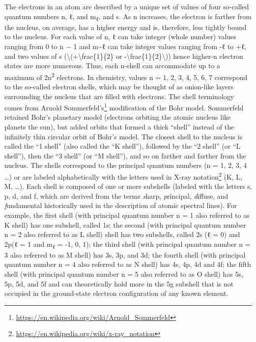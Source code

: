\documentclass[
]{article}
\let\rmarkdownfootnote\footnote%
\def\footnote{\protect\rmarkdownfootnote}
\renewcommand{\href}[2]{#2\footnote{\url{#1}}}
\theoremstyle{definition}
\theoremstyle{definition}
\theoremstyle{definition}
\theoremstyle{remark}
\begin{document}
The electrons in an atom are described by a unique set of values of four
so-called quantum numbers n, ℓ, and m\textsubscript{ℓ}, and s. As n
increases, the electron is farther from the nucleus, on average, has a
higher energy and is, therefore, less tightly bound to the nucleus. For
each value of n, ℓ can take integer (whole number) values ranging from 0
to n − 1 and m\textasciitilde ℓ can take integer values ranging from -ℓ
to +ℓ, and two values of s
({\textbackslash(+\textbackslash frac\{1\}\{2\} or
-\textbackslash frac\{1\}\{2\}\textbackslash)}) hence higher-n electron
states are more numerous. Thus, each n-shell can accommodate up to a
maximum of 2n\textsuperscript{2} electrons. In chemistry, values n = 1,
2, 3, 4, 5, 6, 7 correspond to the so-called electron shells, which may
be thought of as onion-like layers surrounding the nucleus that are
filled with electrons. The shell terminology comes from
\href{https://en.wikipedia.org/wiki/Arnold_Sommerfeld}{Arnold
Sommerfeld's} modification of the Bohr model. Sommerfeld retained Bohr's
planetary model (electrons orbiting the atomic nucleus like planets the
sun), but added orbits that formed a thick ``shell'' instead of the
infinitely thin circular orbit of Bohr's model. The closest shell to the
nucleus is called the ``1 shell'' (also called the ``K shell''),
followed by the ``2 shell'' (or ``L shell''), then the ``3 shell'' (or
``M shell''), and so on farther and farther from the nucleus. The shells
correspond to the principal quantum numbers (n = 1, 2, 3, 4 \ldots) or
are labeled alphabetically with the letters used in
\href{https://en.wikipedia.org/wiki/x-ray_notation}{X-ray notation} (K,
L, M, \ldots). Each shell is composed of one or more subshells (labeled
with the letters s, p, d, and f, which are derived from the terms
\emph{s}harp, \emph{p}rincipal, \emph{d}iffuse, and \emph{f}undamental
historically used in the description of atomic spectral lines). For
example, the first shell (with principal quantum number n = 1 also
referred to as K shell) has one subshell, called 1s; the second (with
principal quantum number n = 2 also referred to as L shell) shell has
two subshells, called 2s (ℓ = 0) and 2p(ℓ = 1 and m\textsubscript{ℓ} =
-1, 0, 1); the third shell (with principal quantum number n = 3 also
referred to as M shell) has 3s, 3p, and 3d; the fourth shell (with
principal quantum number n = 4 also referred to as N shell) has 4s, 4p,
4d and 4f; the fifth shell (with principal quantum number n = 5 also
referred to as O shell) has 5s, 5p, 5d, and 5f and can theoretically
hold more in the 5g subshell that is not occupied in the ground-state
electron configuration of any known element.
\end{document}
